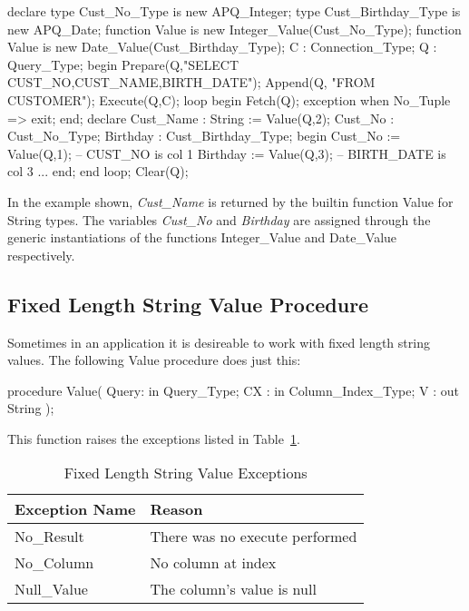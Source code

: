 \documentclass[english,letterpaper]{book}
\begin{document}
\begin{Example}
declare
   type Cust_No_Type is new APQ_Integer;
   type Cust_Birthday_Type is new APQ_Date;
   function Value is new Integer_Value(Cust_No_Type);
   function Value is new Date_Value(Cust_Birthday_Type);
   C : Connection_Type;
   Q : Query_Type;
begin
   Prepare(Q,"SELECT CUST_NO,CUST_NAME,BIRTH_DATE");
   Append(Q, "FROM CUSTOMER");
   Execute(Q,C);
   loop
      begin
         Fetch(Q);
      exception
         when No_Tuple =>
            exit;
      end;
      declare
         Cust_Name : String := Value(Q,2);
         Cust_No :   Cust_No_Type;
         Birthday :  Cust_Birthday_Type;
      begin
         Cust_No  := Value(Q,1);  -- CUST_NO is col 1
         Birthday := Value(Q,3);  -- BIRTH_DATE is col 3
         ...
      end;
   end loop;
   Clear(Q);
\end{Example}

In the example shown, \emph{Cust\_Name} is returned by the builtin
function Value for String types. The variables \emph{Cust\_No} and
\emph{Birthday} are assigned through the generic instantiations of
the functions Integer\_Value and Date\_Value respectively.


\subsection{Fixed Length String Value Procedure}

Sometimes in an application it is desireable to work with fixed length
string values. The following Value procedure does just this:

\begin{Code}
procedure Value(
   Query: in     Query_Type;
   CX :   in     Column_Index_Type;
   V :       out String
);
\end{Code}

This function raises the exceptions listed in Table~\ref{t:fxflsx}.

\begin{table}
   \begin{center}
      \begin{tabular}{ll}
         Exception Name    &  Reason\\
         \hline 
         No\_Result        &  There was no execute performed\\
         No\_Column        &  No column at index\\
         Null\_Value       &  The column's value is null\\
      \end{tabular}
   \end{center}
   \caption{Fixed Length String Value Exceptions}\label{t:fxflsx}
\end{table}
\end{document}

